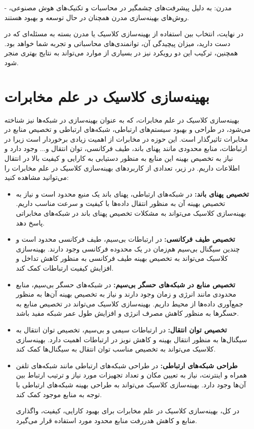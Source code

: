 - مدرن: به دلیل پیشرفت‌های چشمگیر در محاسبات و تکنیک‌های هوش مصنوعی، روش‌های بهینه‌سازی مدرن همچنان در حال توسعه و بهبود هستند.

\vspace{7mm}
در نهایت، انتخاب بین استفاده از بهینه‌سازی کلاسیک یا مدرن بسته به مسئله‌ای که در دست دارید، میزان پیچیدگی آن، توانمندی‌های محاسباتی و تجربه شما خواهد بود. همچنین، ترکیب این دو رویکرد نیز در بسیاری از موارد می‌تواند به نتایج بهتری منجر شود.
\section{بهینه‌سازی کلاسیک در علم مخابرات}

بهینه‌سازی کلاسیک در علم مخابرات، که به عنوان بهینه‌سازی در شبکه‌ها نیز شناخته می‌شود، در طراحی و بهبود سیستم‌های ارتباطی، شبکه‌های ارتباطی و تخصیص منابع در مخابرات تاثیرگذار است. این حوزه در مخابرات از اهمیت زیادی برخوردار است زیرا در ارتباطات، منابع محدودی مانند پهنای باند، طیف فرکانسی، توان انتقال و... وجود دارد و نیاز به تخصیص بهینه این منابع به منظور دستیابی به کارایی و کیفیت بالا در انتقال اطلاعات داریم. در زیر، تعدادی از کاربردهای بهینه‌سازی کلاسیک در علم مخابرات را می‌توانید مشاهده کنید:
\begin{itemize}
	\item \textbf{تخصیص پهنای باند:}
در شبکه‌های ارتباطی، پهنای باند یک منبع محدود است و نیاز به تخصیص بهینه آن به منظور انتقال داده‌ها با کیفیت و سرعت مناسب داریم. بهینه‌سازی کلاسیک می‌تواند به مشکلات تخصیص پهنای باند در شبکه‌های مخابراتی پاسخ دهد.

\item \textbf{تخصیص طیف فرکانسی:}
در ارتباطات بی‌سیم، طیف فرکانسی محدود است و چندین سیگنال بی‌سیم هم‌زمان در یک محدوده فرکانسی وجود دارند. بهینه‌سازی کلاسیک می‌تواند به تخصیص بهینه طیف فرکانسی به منظور کاهش تداخل و افزایش کیفیت ارتباطات کمک کند.

\item \textbf{تخصیص منابع در شبکه‌های حسگر بی‌سیم:}
در شبکه‌های حسگر بی‌سیم، منابع محدودی مانند انرژی و زمان وجود دارند و نیاز به تخصیص بهینه آن‌ها به منظور جمع‌آوری داده‌ها از محیط داریم. بهینه‌سازی کلاسیک می‌تواند در تخصیص منابع به حسگرها به منظور کاهش مصرف انرژی و افزایش طول عمر شبکه مفید باشد.

\item \textbf{تخصیص توان انتقال:}
در ارتباطات سیمی و بی‌سیم، تخصیص توان انتقال به سیگنال‌ها به منظور انتقال بهینه و کاهش نویز در ارتباطات اهمیت دارد. بهینه‌سازی کلاسیک می‌تواند به تخصیص مناسب توان انتقال به سیگنال‌ها کمک کند.

\item \textbf{طراحی شبکه‌های ارتباطی:}
در طراحی شبکه‌های ارتباطی مانند شبکه‌های تلفن همراه و اینترنت، نیاز به تعیین مکان و تعداد تجهیزات مورد نیاز و ترتیب ارتباط بین آن‌ها وجود دارد. بهینه‌سازی کلاسیک می‌تواند به طراحی بهینه شبکه‌های ارتباطی با توجه به منابع موجود کمک کند.

\vspace{5mm}

در کل، بهینه‌سازی کلاسیک در علم مخابرات برای بهبود کارایی، کیفیت، واگذاری منابع و کاهش هدررفت منابع محدود مورد استفاده قرار می‌گیرد.
\end{itemize}
